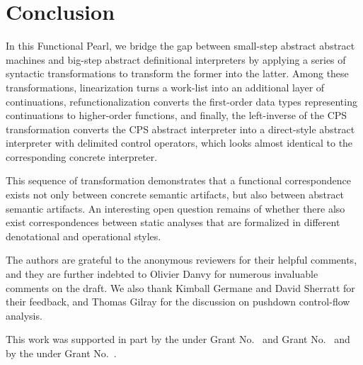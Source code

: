 \documentclass[acmsmall, screen]{acmart}\settopmatter{}
\begin{document}
\section{Conclusion}\label{sec:conclusion}


In this Functional Pearl, we bridge the gap between small-step abstract abstract machines
and big-step abstract definitional interpreters by applying a series of syntactic
transformations to transform the former into the latter. Among these transformations,
linearization turns a work-list into an additional layer of continuations, refunctionalization
converts the first-order data types representing continuations to higher-order functions,
and finally, the left-inverse of the CPS transformation converts the CPS abstract interpreter
into a direct-style abstract interpreter with delimited control operators, which looks almost
identical to the corresponding concrete interpreter.

This sequence of transformation demonstrates that a functional correspondence exists
not only between concrete semantic artifacts, but also between abstract semantic artifacts.
An interesting open question remains of whether there also exist
correspondences between static analyses that are formalized in different
denotational and operational styles.

\begin{acks}                            %
  The authors are grateful to the anonymous reviewers for their
  helpful comments, and they are further indebted to Olivier Danvy
  for numerous invaluable comments on the draft. We also thank
  Kimball Germane and David Sherratt for their feedback, and
  Thomas Gilray for the discussion on pushdown control-flow analysis.

  This work was supported in part by the
   under Grant
  No.~ and Grant
  No.~ and by the
   under Grant
  No.~.  
\end{acks}




\end{document}
